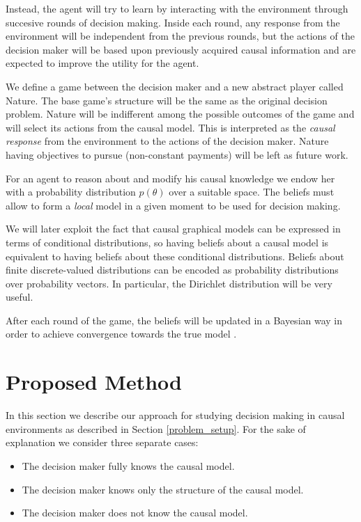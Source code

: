 \documentclass{article}
\begin{document}
Instead, the agent will try to learn by interacting with the environment through succesive rounds of decision making. Inside each round, any response from the environment will be independent from the previous rounds, but the actions of the decision maker will be based upon previously acquired causal information and are expected to improve the utility for the agent.

We define a game between the decision maker and a new abstract player called Nature. The base game's structure will be the same as the original decision problem. Nature will be indifferent among the possible outcomes of the game and will select its actions from the causal model. This is interpreted as the \textit{causal response} from the environment to the actions of the decision maker. Nature having objectives to pursue (non-constant payments) will be left as future work.

For an agent to reason about and modify his causal knowledge we endow her with a probability distribution $p(\theta)$ over a suitable space. The beliefs must allow to form a \textit{local} model in a given moment to be used for decision making.

We will later exploit the fact that causal graphical models can be expressed in terms of conditional distributions, so having beliefs about a causal model is equivalent to having beliefs about these conditional distributions. Beliefs about finite discrete-valued distributions can be encoded as probability distributions over probability vectors. In particular, the Dirichlet distribution will be very useful.

After each round of the game, the beliefs will be updated in a Bayesian way in order to achieve convergence towards the true model \cite{shoham2008multiagent}.

\section{Proposed Method}
In this section we describe our approach for studying decision making in causal environments as described in Section \ref{problem_setup}. For the sake of explanation we consider three separate cases:

\begin{itemize}
\item The decision maker fully knows the causal model.
\item The decision maker knows only the structure of the causal model.
\item The decision maker does not know the causal model.
\end{itemize}
\end{document}
